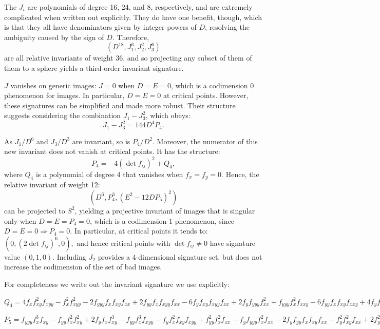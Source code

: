 \documentclass[review,onefignum,onetabnum]{siamonline190516}
\begin{document}
The $J_i$ are polynomials of degree 16, 24, and 8, respectively, and are extremely complicated when written out explicitly. They do have one benefit, though, which is that they  all have denominators given by integer powers of $D$, resolving the ambiguity caused by the sign of $D$. Therefore, $$ (D^{18}, J_1^3, J_2^2, J_3^6)$$ are all relative invariants of weight 36, and so projecting any subset of them of them to a sphere yields a third-order invariant signature.

$J$ vanishes on generic images: $J=0$ when $D=E=0$, which is a codimension 0 phenomenon for images. In particular, $D=E=0$ at critical points. However, these signatures can be simplified and made more robust. Their structure suggests considering the combination $J_1 - J_3^2$, which obeys:
$$J_1 - J_3^2 = 144 D^4 P_4.$$

As $J_1/D^6$ and $J_3/D^3$ are invariant, so is $P_4/D^2$. 
Moreover, the numerator of this new invariant does not vanish at critical points.  It has the structure:
$$P_4 = -4(\det f_{ij})^2 + Q_4,$$
where $Q_4$ is a polynomial of degree 4 that vanishes when $f_x=f_y=0$. Hence, the relative invariant of weight 12:
$$ (D^6, P_4^3, (E^2-12D P_5)^2)$$
can be projected to $S^2$, yielding a projective invariant of images that is singular only when $D=E=P_4=0$, which is a codimension 1 phenomenon, since  $D=E=0\Rightarrow P_4=0$. In particular, at critical points it tends to:
$(0, (2\det f_{ij})^6, 0),$ and hence critical points with $\det f_{ij}\ne 0$ have signature value $(0,1,0)$.
Including $J_2$ provides a 4-dimensional signature set, but does not increase the codimension of the set of bad images.

For completeness we write out the invariant signature we use explicitly:

$Q_4=4 f_x  f_{xy} ^2 f_{xyy}  - 
f_x ^2 f_{xyy} ^2 - 
 2 f_{yyy}  f_x  f_{xy}  f_{xx}  + 
 2 f_{yy}  f_x  f_{xyy}  f_{xx}  - 
 6 f_{y}  f_{xy}  f_{xyy}  f_{xx}  + 
 2 f_{y}  f_{yyy}  f_{xx} ^2 + 
 f_{yyy}  f_x ^2 f_{xxy}  - 
 6 f_{yy}  f_x  f_{xy}  f_{xxy}  + 
 4 f_{y}  f_{xy} ^2 f_{xxy}  + 
 f_{y}  f_x  f_{xyy}  f_{xxy}  + 
 2 f_{y}  f_{yy}  f_{xx}  f_{xxy}  - 
 f_{y} ^2 f_{xxy} ^2 + 
 2 f_{yy} ^2 f_x  f_{xxx}  - 
 f_{y}  f_{yyy}  f_x  f_{xxx}  - 
 2 f_{y}  f_{yy}  f_{xy}  f_{xxx}  + f_{y} ^2 f_{xyy}  f_{xxx}, $
 
$P_5=f_{yyy}  f_{x} ^3 f_{xy}  - 
f_{yy}  f_{x} ^2 f_{xy} ^2 + 
 2 f_{y}  f_{x}  f_{xy} ^3 - 
 f_{yy}  f_{x} ^3 f_{xyy}  - 
 f_{y}  f_{x} ^2 f_{xy}  f_{xyy}  + 
 f_{yy} ^2 f_{x} ^2 f_{xx}  - 
 f_{y}  f_{yyy}  f_{x} ^2 f_{xx}  - 
 2 f_{y}  f_{yy}  f_{x}  f_{xy}  f_{xx}  - 
 f_{y} ^2 f_{xy} ^2 f_{xx}  + 
 2 f_{y} ^2 f_{x}  f_{xyy}  f_{xx}  + 
 f_{y} ^2 f_{yy}  f_{xx} ^2 + 
 2 f_{y}  f_{yy}  f_{x} ^2 f_{xxy}  - 
 f_{y} ^2 f_{x}  f_{xy}  f_{xxy}  - 
 f_{y} ^3 f_{xx}  f_{xxy}  - 
 f_{y} ^2 f_{yy}  f_{x}  f_{xxx}  + 
 f_{y} ^3 f_{xy}  f_{xxx}. $
 
\end{document}
